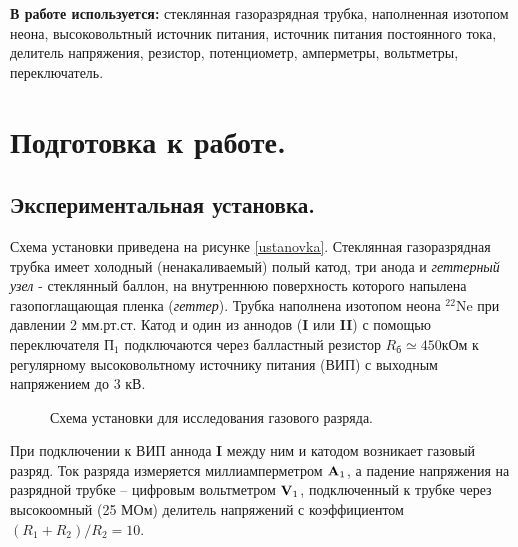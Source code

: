 \documentclass[a4paper,12pt]{article} %
\begin{document}
\textbf{В работе используется:} стеклянная газоразрядная трубка, наполненная изотопом неона, высоковольтный источник питания, источник питания постоянного тока, делитель напряжения, резистор, потенциометр, амперметры, вольтметры, переключатель.

\section{Подготовка к работе.}
\subsection{Экспериментальная установка.}

Схема установки приведена на рисунке \eqref{ustanovka}. Стеклянная газоразрядная трубка имеет холодный (ненакаливаемый) полый катод, три анода и \textit{геттерный узел} - стеклянный баллон, на внутреннюю поверхность которого напылена газопоглащающая пленка (\textit{геттер}).
Трубка наполнена изотопом неона $^{22}\text{Ne}$ при давлении 2 мм.рт.ст. Катод и один из аннодов (\textbf{I} или \textbf{II}) с помощью переключателя $\text{П}_1$ подключаются через балластный резистор $R_\text{б} \simeq 450 \text{кОм}$ к регулярному высоковольтному источнику питания (ВИП) с выходным напряжением до 3 кВ.

\begin{figure}[H]\label{ustanovka}
	\caption{Схема установки для исследования газового разряда.}
\label{fig:image}
\end{figure}

При подключении к ВИП аннода \textbf{I} между ним и катодом возникает газовый разряд. Ток разряда измеряется миллиамперметром $\text{\textbf{A}}_1$, а падение напряжения на разрядной трубке -- цифровым вольтметром $\text{\textbf{V}}_1$, подключенный к трубке через высокоомный (25 МОм) делитель напряжений с коэффициентом $(R_1 + R_2) / R_2 = 10$.
\end{document}
